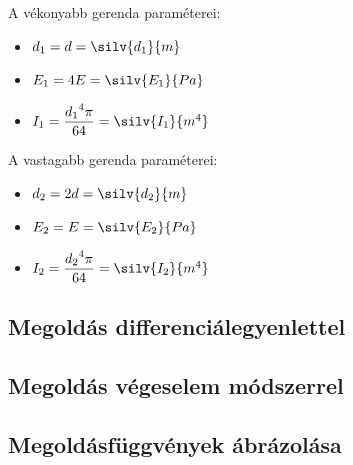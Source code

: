 \documentclass[a4paper, 12pt]{scrartcl}
\begin{document}
\bgroup
\begin{multicols}{2}
  A vékonyabb gerenda paraméterei:
  \begin{itemize}
    \item $d_1 = d = \silv{d_1}{m}$
          \sisci{} 
    \item $E_1 = 4E = \silv{E_1}{Pa}$
    \item $I_1 = \dfrac{{d_1}^4 \pi}{64} = \silv{I_1}{m^4}$
  \end{itemize}
  A vastagabb gerenda paraméterei:
  \begin{itemize}
    \item $d_2 = 2d = \silv{d_2}{m}$
          \sisci{} 
    \item $E_2 = E = \silv{E_2}{Pa}$
    \item $I_2 = \dfrac{{d_2}^4 \pi}{64} = \silv{I_2}{m^4}$
  \end{itemize}
\end{multicols}
\egroup

\subsection{Megoldás differenciálegyenlettel} %


\subsection{Megoldás végeselem módszerrel} %


\subsection{Megoldásfüggvények ábrázolása} %



\end{document}
